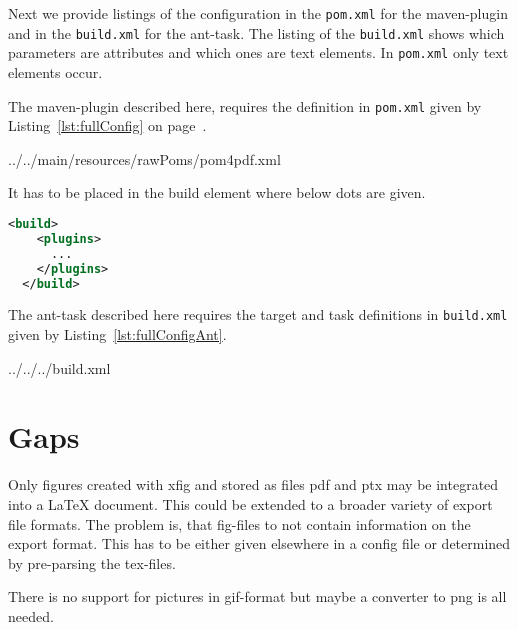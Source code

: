\documentclass[12pt]{book}
\newcommand{\gls}[1]{#1}
\begin{document}
Next we provide listings of the configuration 
in the \texttt{pom.xml} for the maven-plugin 
and in the \texttt{build.xml} for the ant-task. 
The listing of the \texttt{build.xml} shows 
which parameters are attributes and which ones are text elements. 
In \texttt{pom.xml} only text elements occur. 


The maven-plugin described here, 
requires the definition in \texttt{pom.xml}
given by Listing~\ref{lst:fullConfig} on page~\pageref{lst:fullConfig}. 


{../../main/resources/rawPoms/pom4pdf.xml}%

It has to be placed in the build element where below dots are given. 

\begin{lstlisting}[language=xml]
  <build>
    <plugins>
      ...
    </plugins>
  </build>
\end{lstlisting}


The ant-task described here 
requires the target and task definitions in \texttt{build.xml}
given by Listing~\ref{lst:fullConfigAnt}. 


{../../../build.xml}%



\chapter{Gaps}\label{chap:gaps}

Only figures created with xfig and stored as files pdf and ptx 
may be integrated into a \LaTeX{} document. 
This could be extended to a broader variety of export file formats. 
The problem is, that fig-files to not contain information on the export
format. 
This has to be either given elsewhere in a config file 
or determined by pre-parsing the tex-files. 

There is no support for pictures in \gls{gif}-format 
but maybe a converter to \gls{png} is all needed. 
\end{document}
